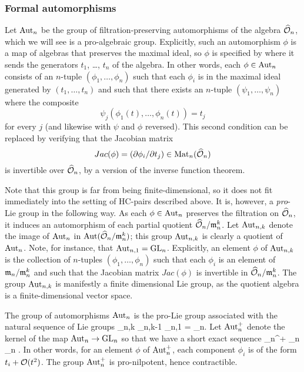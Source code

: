 \documentclass[10pt]{amsart}
\begin{document}
\subsubsection{Formal automorphisms}

Let ${\rm Aut}_n$ be the group of filtration-preserving automorphisms of the algebra $\widehat{\mathcal O}_n$,
which we will see is a pro-algebraic group.
Explicitly, such an automorphism $\phi$ is a map of algebras that preserves the maximal ideal, 
so $\phi$ is specified by where it sends the generators $t_1$, \dots, $t_n$ of the algebra.
In other words, each $\phi \in {\rm Aut}_n$ consists of an $n$-tuple $(\phi_1,\ldots,\phi_n)$ 
such that each $\phi_i$ is in the maximal ideal generated by $(t_1,\ldots,t_n)$ and such that there exists an $n$-tuple $(\psi_1,\ldots,\psi_n)$ 
where the composite
\[
\psi_j(\phi_1(t),\ldots,\phi_n(t)) = t_j
\]
for every $j$ (and likewise with $\psi$ and $\phi$ reversed).
This second condition can be replaced by verifying that the Jacobian matrix
\[
Jac(\phi) = (\partial \phi_i/\partial t_j) \in {\rm Mat}_n(\widehat{\mathcal O}_n)
\]
is invertible over $\widehat{\mathcal O}_n$, by a version of the inverse function theorem.

Note that this group is far from being finite-dimensional, so it does not fit immediately into the setting of HC-pairs described above. 
It is, however, a {\em pro}-Lie group in the following way. 
As each $\phi \in {\rm Aut}_n$ preserves the filtration on $\widehat{\mathcal O}_n$, it induces an automorphism of each partial quotient $\widehat{\mathcal O}_n/{\mathfrak m}_n^k$.
Let ${\rm Aut}_{n,k}$ denote the image of ${\rm Aut}_n$ in ${\rm Aut}(\widehat{\mathcal O}_n/{\mathfrak m}_n^k)$; this group ${\rm Aut}_{n,k}$ is clearly a quotient of ${\rm Aut}_n$.
Note, for instance, that ${\rm Aut}_{n,1} = {\rm GL}_n$.
Explicitly, an element $\phi$ of ${\rm Aut}_{n,k}$ is the collection of $n$-tuples $(\phi_1,\ldots,\phi_n)$ 
such that each $\phi_i$ is an element of ${\mathfrak m}_n/{\mathfrak m}_n^k$ and such that the Jacobian matrix $Jac(\phi)$ is invertible in $\widehat{\mathcal O}_n/{\mathfrak m}_n^k$.
The group ${\rm Aut}_{n,k}$ is manifestly a finite dimensional Lie group, as the quotient algebra is a finite-dimensional vector space. 
 
The group of automorphisms ${\rm Aut}_n$ is the pro-Lie group associated with the natural sequence of Lie groups
\ben
\cdots \to \Aut_{n,k} \to \Aut_{n,k-1} \to \cdots \to \Aut_{n,1} = \GL_n.
\een
Let ${\rm Aut}_n^+$ denote the kernel of the map ${\rm Aut}_n \to {\rm GL}_n$ so that we have a short exact sequence
 \to \Aut_n^+ \to \Aut_n \to \GL_n  .
\een
In other words, for an element $\phi$ of ${\rm Aut}_n^+$, each component
$\phi_i$ is of the form $t_i + \mathcal O(t^2)$. The group ${\rm Aut}_n^+$ is
pro-nilpotent, hence contractible. 
\end{document}
